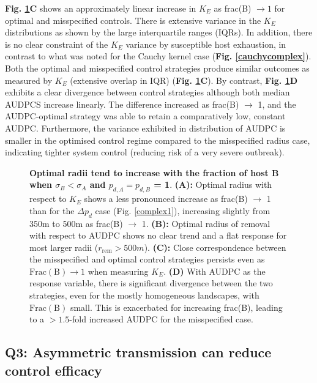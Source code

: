 \documentclass[11pt,letterpaper]{article}
\begin{document}
\textbf{Fig. \ref{sigma}C} shows an approximately linear increase in $K_E$ as frac(B) $\rightarrow 1$ for optimal and misspecified controls. There is extensive variance in the $K_E$ distributions as shown by the large interquartile ranges (IQRs). In addition, there is no clear constraint of the $K_E$ variance by susceptible host exhaustion, in contrast to what was noted for the Cauchy kernel case (\textbf{Fig. \ref{cauchycomplex}}). Both the optimal and misspecified control strategies produce similar outcomes as measured by $K_E$ (extensive overlap in IQR) (\textbf{Fig. \ref{sigma}C}). By contrast, \textbf{Fig. \ref{sigma}D} exhibits a clear divergence between control strategies although both median AUDPCS increase linearly. The difference increased as frac(B) $\rightarrow$ 1, and the AUDPC-optimal strategy was able to retain a comparatively low, constant AUDPC. Furthermore, the variance exhibited in distribution of AUDPC is smaller in the optimised control regime compared to the misspecified radius case, indicating tighter system control (reducing risk of a very severe outbreak).

\begin{figure}
	\centering
	
	\caption{\label{sigma} \textbf{Optimal radii tend to increase with the fraction of host B  when $\sigma_B < \sigma_A$ and \textbf{$p_{d,A} = p_{d,B}$} = 1}. \textbf{(A):} Optimal radius with respect to $K_E$  shows a less pronounced increase as frac(B) $\rightarrow$ 1 than for the $\Delta p_{d}$  case (Fig. \ref{complex1}), increasing slightly from 350m to 500m as frac(B) $\rightarrow$ 1. \textbf{(B):} Optimal radius of removal with respect to AUDPC shows no clear trend and a flat response for most larger radii ($r_{\mathrm{rem}} > 500m$).
	 \textbf{(C):} Close correspondence between the misspecified and optimal control strategies persists even as $\mathrm{Frac(B)} \rightarrow 1$ when measuring $K_{E}$.  \textbf{(D)} With AUDPC as the response variable, there is significant divergence between the two strategies, even for the mostly homogeneous landscapes, with $\mathrm{Frac(B)}$ small. This is exacerbated for increasing frac(B), leading to a $>1.5$-fold increased AUDPC for the misspecified case.}
\end{figure}

\newpage
\FloatBarrier

\FloatBarrier
\subsection*{Q3: Asymmetric transmission can reduce control efficacy}
\end{document}
